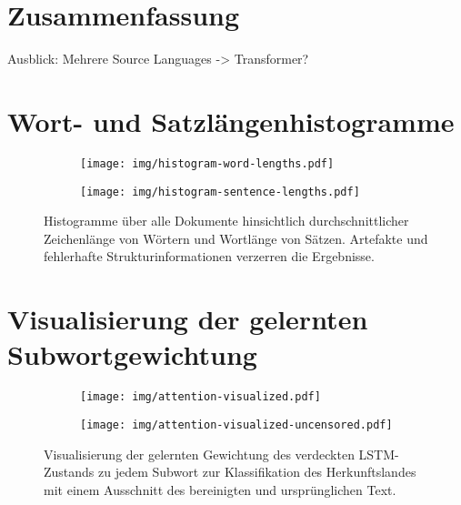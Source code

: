 \documentclass[bachelor,german]{info1thesis}
\begin{document}
\chapter{Zusammenfassung}

Ausblick: Mehrere Source Languages -> Transformer?



\thesisbibliography


\appendix

\chapter{Wort- und Satzlängenhistogramme}
\label{app:word-sentence-lengths}

\begin{figure}[h!]
     \centering
     \begin{subfigure}[b]{0.49\textwidth}
         \centering
         \texttt{[image: img/histogram-word-lengths.pdf]}
         \label{fig:hist-mentions}
     \end{subfigure}
     \hfill
     \begin{subfigure}[b]{0.49\textwidth}
         \centering
         \texttt{[image: img/histogram-sentence-lengths.pdf]}
         \label{fig:hist-clusters}
     \end{subfigure}
     \caption{Histogramme über alle Dokumente hinsichtlich durchschnittlicher Zeichenlänge von Wörtern und Wortlänge von Sätzen. Artefakte und fehlerhafte Strukturinformationen verzerren die Ergebnisse.}
     \label{fig:droc-histograms}
\end{figure}

\chapter{Visualisierung der gelernten Subwortgewichtung}

\begin{figure}[h!]
     \centering
     \begin{subfigure}[b]{\textwidth}
         \centering
         \texttt{[image: img/attention-visualized.pdf]}
         \label{fig:visualized-cleaned-text}
     \end{subfigure}
     \begin{subfigure}[b]{\textwidth}
         \centering
         \vspace{.5em}
         \texttt{[image: img/attention-visualized-uncensored.pdf]}
         \label{fig:visualized-original-text}
     \end{subfigure}
     \caption{Visualisierung der gelernten Gewichtung des verdeckten LSTM-Zustands zu jedem Subwort zur Klassifikation des Herkunftslandes mit einem Ausschnitt des bereinigten und ursprünglichen Text.}
     \label{fig:visualized-texts}
\end{figure}
\end{document}
